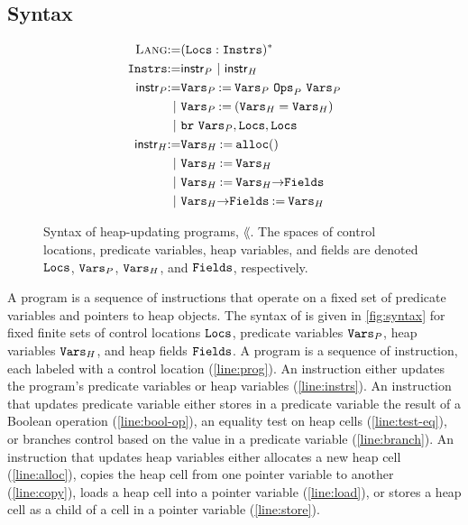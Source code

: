 \subsection{Syntax}
\label{sec:syntax}
\begin{figure}
  \centering
  \begin{align}
    \textsc{Lang} \mathbin{:=} & (\mathtt{Locs}: \mathtt{Instrs})^{*} \label{line:prog} \\
    \mathtt{Instrs} \mathbin{:=} & \mathsf{instr}_P\ |\ \mathsf{instr}_H \label{line:instrs} \\
    \mathsf{instr}_P \mathbin{:=} &
    \mathtt{Vars}_P \mathbin{:=} \mathtt{Vars}_P\ \mathtt{Ops}_P\ \mathtt{Vars}_P
    \label{line:bool-op} \\
    |\ & \mathtt{Vars}_P \mathbin{:=} (\mathtt{Vars}_H = \mathtt{Vars}_H)
    \label{line:test-eq} \\
    |\ & \mathtt{br}\ \mathtt{Vars}_P, \mathtt{Locs}, \mathtt{Locs} \label{line:branch} \\
    \mathsf{instr}_H \mathbin{:=} & \mathtt{Vars}_H \mathbin{:=} \mathtt{alloc}()
    \label{line:alloc} \\
    |\ & \mathtt{Vars}_H \mathbin{:=} \mathtt{Vars}_H \label{line:copy} \\
    |\ & \mathtt{Vars}_H \mathbin{:=} \mathtt{Vars}_H \mathtt{->} \mathtt{Fields}
    \label{line:load} \\
    |\ & \mathtt{Vars}_H \mathtt{->} \mathtt{Fields} \mathbin{:=} \mathtt{Vars}_H
    \label{line:store}
  \end{align}
  \caption{Syntax of heap-updating programs, $\lang$.
    The spaces of control locations, predicate variables, heap
    variables, and fields are denoted $\mathtt{Locs}$, $\mathtt{Vars}_P$,
    $\mathtt{Vars}_H$, and $\mathtt{Fields}$, respectively.
  }
  \label{fig:syntax}
\end{figure}

A \lang program is a sequence of instructions that operate on a fixed
set of predicate variables and pointers to heap objects.
%
The syntax of \lang is given in \autoref{fig:syntax} for fixed finite
sets of control locations $\mathtt{Locs}$, predicate variables $\mathtt{Vars}_P$,
heap variables $\mathtt{Vars}_H$, and heap fields $\mathtt{Fields}$.
%
A program is a sequence of instruction, each labeled with a control
location (\autoref{line:prog}).
%
An instruction either updates the program's predicate variables or
heap variables (\autoref{line:instrs}).
%
An instruction that updates predicate variable either stores in a
predicate variable the result of a Boolean operation
(\autoref{line:bool-op}),
%
an equality test on heap cells (\autoref{line:test-eq}),
%
or branches control based on the value in a predicate variable
(\autoref{line:branch}).
%
An instruction that updates heap variables either allocates a new heap
cell (\autoref{line:alloc}),
%
copies the heap cell from one pointer variable to another
(\autoref{line:copy}),
%
loads a heap cell into a pointer variable (\autoref{line:load}),
%
or stores a heap cell as a child of a cell in a pointer variable
(\autoref{line:store}).

